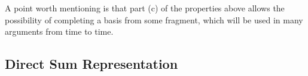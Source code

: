 A point worth mentioning is that part (c) of the properties above allows the possibility of completing a basis from some fragment, which will be used in many arguments from time to time.

\subsection{Direct Sum Representation}
\label{section:directsum}

